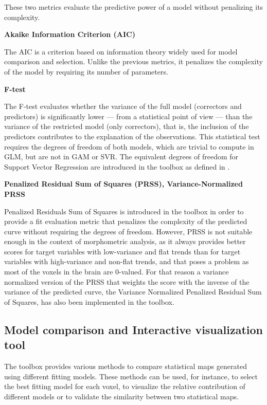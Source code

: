\documentclass{article}
\begin{document}
These two metrics evaluate the predictive power of a model without penalizing its complexity.

\textbf{Akaike Information Criterion (AIC)}

The AIC is a criterion based on information theory widely used for model comparison and selection. Unlike the previous metrics, it penalizes the complexity of the model by requiring its number of parameters.

\textbf{F-test} 

The F-test evaluates whether the variance of the full model (correctors and predictors) is significantly lower — from a statistical point of view — than the variance of the restricted model (only correctors), that is, the inclusion of the predictors contributes to the explanation of the observations. 
This statistical test requires the degrees of freedom of both models, which are trivial to compute in GLM, but are not in GAM or SVR. The equivalent degrees of freedom for Support Vector Regression are introduced in the toolbox as defined in \cite{equivalent_df_SVR}.

\textbf{Penalized Residual Sum of Squares (PRSS), Variance-Normalized PRSS} 

Penalized Residuals Sum of Squares is introduced in the toolbox in order to provide a fit evaluation metric that penalizes the complexity of the predicted curve without requiring the degrees of freedom. However, PRSS is not suitable enough in the context of morphometric analysis, as it always provides better scores for target variables with low-variance and flat trends than for target variables with high-variance and non-flat trends, and that poses a problem as most of the voxels in the brain are 0-valued.
For that reason a variance normalized version of the PRSS that weights the score with the inverse of the variance of the predicted curve, the Variance Normalized Penalized Residual Sum of Squares, has also been implemented in the toolbox.

\subsection{Model comparison and Interactive visualization tool}

The toolbox provides various methods to compare statistical maps generated using different fitting models. These methods can be used, for instance, to select the best fitting model for each voxel, to visualize the relative contribution of different models or to validate the similarity between two statistical maps.
\end{document}
